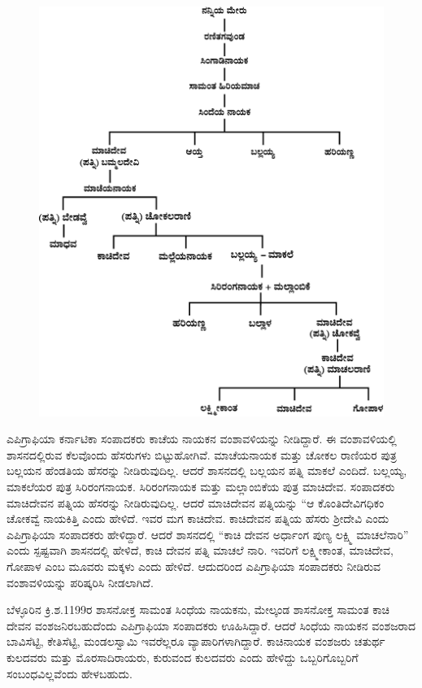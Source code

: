 \begin{figure}[H]
\includegraphics[scale=1.05]{images/chap3/chap3fig7.jpeg}
\end{figure}

ಎಪಿಗ್ರಾಫಿಯಾ ಕರ್ನಾಟಿಕಾ ಸಂಪಾದಕರು ಕಾಚೆಯ ನಾಯಕನ ವಂಶಾವಳಿಯನ್ನು ನೀಡಿದ್ದಾರೆ. ಈ ವಂಶಾವಳಿ\-ಯಲ್ಲಿ ಶಾಸನದಲ್ಲಿರುವ ಕೆಲವೊಂದು ಹೆಸರುಗಳು ಬಿಟ್ಟುಹೋಗಿವೆ. ಮಾಚೆಯನಾಯಕ ಮತ್ತು ಚೋಕಲ ರಾಣಿಯರ ಪುತ್ರ ಬಲ್ಲಯನ ಹೆಂಡತಿಯ ಹೆಸರನ್ನು ನೀಡಿರುವುದಿಲ್ಲ. ಆದರೆ ಶಾಸನದಲ್ಲಿ ಬಲ್ಲಯನ ಪತ್ನಿ ಮಾಕಲೆ ಎಂದಿದೆ. ಬಲ್ಲಯ್ಯ, ಮಾಕಲೆಯರ ಪುತ್ರ ಸಿರಿರಂಗನಾಯಕ. ಸಿರಿರಂಗನಾಯಕ ಮತ್ತು ಮಲ್ಲಾಂಬಿಕೆಯ ಪುತ್ರ ಮಾಚಿದೇವ. ಸಂಪಾದಕರು ಮಾಚಿದೇವನ ಪತ್ನಿಯ ಹೆಸರನ್ನು ನೀಡಿರುವುದಿಲ್ಲ. ಆದರೆ ಮಾಚಿದೇವನ ಪತ್ನಿಯನ್ನು “ಆ ಕೊಂತಿದೇವಿಗಧಿಕಂ ಚೋಕವ್ವೆ ನಾಯಕಿತ್ತಿ ಎಂದು ಹೇಳಿದೆ. ಇವರ ಮಗ ಕಾಚಿದೇವ. ಕಾಚಿದೇವನ ಪತ್ನಿಯ ಹೆಸರು ಶ‍್ರೀದೇವಿ ಎಂದು ಎಪಿಗ್ರಾಫಿಯಾ ಸಂಪಾದಕರು ಹೇಳಿದ್ದಾರೆ. ಆದರೆ ಶಾಸನದಲ್ಲಿ “ಕಾಚಿ ದೇವನ ಅರ್ಧಾಂಗ ಪುಣ್ಯ ಲಕ್ಷ್ಮಿ ಮಾಚಲೆನಾರಿ” ಎಂದು ಸ್ಪಷ್ಟವಾಗಿ ಶಾಸನದಲ್ಲಿ ಹೇಳಿದೆ, ಕಾಚಿ ದೇವನ ಪತ್ನಿ ಮಾಚಲೆ ನಾರಿ. ಇವರಿಗೆ ಲಕ್ಷ್ಮೀಕಾಂತ, ಮಾಚಿದೇವ, ಗೋಪಾಳ ಎಂಬ ಮೂವರು ಮಕ್ಕಳು ಎಂದು ಹೇಳಿದೆ. ಆದುದರಿಂದ ಎಪಿಗ್ರಾಫಿಯಾ ಸಂಪಾದಕರು ನೀಡಿರುವ ವಂಶಾವಳಿಯನ್ನು ಪರಿಷ್ಕರಿಸಿ ನೀಡಲಾಗಿದೆ.

ಬೆಳ್ಳೂರಿನ ಕ್ರಿ.ಶ.1199ರ ಶಾಸನೋಕ್ತ ಸಾಮಂತ ಸಿಂಧೆಯ ನಾಯಕನು, ಮೇಲ್ಕಂಡ ಶಾಸನೋಕ್ತ ಸಾಮಂತ ಕಾಚಿ ದೇವನ ವಂಶಜನಿರಬಹುದೆಂದು ಎಪಿಗ್ರಾಫಿಯಾ ಸಂಪಾದಕರು ಊಹಿಸಿದ್ದಾರೆ. ಆದರೆ ಸಿಂಧೆಯ ನಾಯಕನ ವಂಶಜರಾದ ಬಾವಿಸೆಟ್ಟಿ, ಕೇತಿಸೆಟ್ಟಿ, ಮಂಡಲಸ್ವಾಮಿ ಇವರೆಲ್ಲರೂ ವ್ಯಾಪಾರಿಗಳಾಗಿದ್ದಾರೆ. ಕಾಚಿನಾಯಕ ವಂಶಜರು ಚತುರ್ಥ ಕುಲದವರು ಮತ್ತು ಮೊರಸಾದಿರಾಯರು, ಕುರುವಂದ ಕುಲದವರು ಎಂದು ಹೇಳಿದ್ದು ಒಬ್ಬರಿಗೊಬ್ಬರಿಗೆ ಸಂಬಂಧ\-ವಿಲ್ಲವೆಂದು ಹೇಳಬಹುದು.


